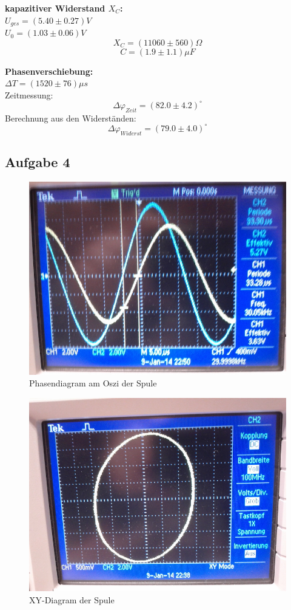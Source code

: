 \documentclass[12pt,a4paper]{article}
\begin{document}
\begin{multicols}{2}
\textbf{kapazitiver Widerstand $X_C$:}\\
$U_{ges}=(5.40 \pm 0.27)V$\\
$U_0=(1.03\pm 0.06)V$\\
$$X_C=(11060\pm 560)\Omega$$
$$C=(1.9\pm 1.1)\mu F$$

\textbf{Phasenverschiebung:}\\
$\Delta T = (1520\pm 76) \mu s$\\
Zeitmessung:
$$\Delta \varphi_{Zeit} = (82.0 \pm 4.2)^\circ$$
Berechnung aus den Widerständen:
$$\Delta \varphi_{Widerst} = (79.0 \pm 4.0)^\circ$$

\subsection{Aufgabe 4}
\begin{figure}[H]
	\centering
	\includegraphics[scale=0.25]{./figure/30kHz_spule.jpg}
	\caption{Phasendiagram am Oszi der Spule}
	\label{fig:phase_spule}
\end{figure}
\begin{figure}[H]
	\centering
	\includegraphics[scale=0.25]{./figure/XY_spule.jpg}
	\caption{XY-Diagram der Spule}
	\label{fig:xy_spule}
\end{figure}


\end{multicols}
\end{document}
